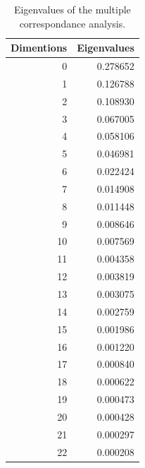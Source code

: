 \documentclass[a4paper,twoside,12pt]{book}
\begin{document}
\begin{appendices}
\begin{table}
\centering
\caption{Eigenvalues of the multiple correspondance analysis.}
\label{id:tab:MCAEigenvalues}
	\begin{tabular}{rr}
		\toprule
		Dimentions &  Eigenvalues \\
		\midrule
				0 &     0.278652 \\
				1 &     0.126788 \\
				2 &     0.108930 \\
				3 &     0.067005 \\
				4 &     0.058106 \\
				5 &     0.046981 \\
				6 &     0.022424 \\
				7 &     0.014908 \\
				8 &     0.011448 \\
				9 &     0.008646 \\
				10 &     0.007569 \\
				11 &     0.004358 \\
				12 &     0.003819 \\
				13 &     0.003075 \\
				14 &     0.002759 \\
				15 &     0.001986 \\
				16 &     0.001220 \\
				17 &     0.000840 \\
				18 &     0.000622 \\
				19 &     0.000473 \\
				20 &     0.000428 \\
				21 &     0.000297 \\
				22 &     0.000208 \\
		\bottomrule
	\end{tabular}
\end{table} 


\end{appendices}
\end{document}
